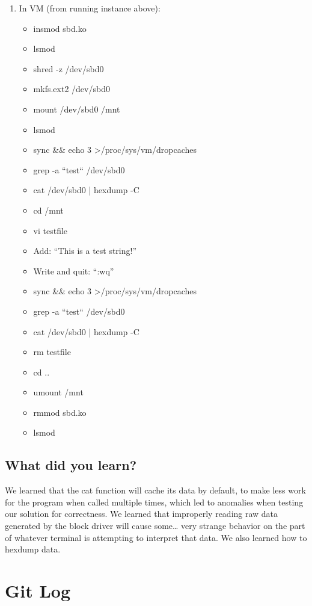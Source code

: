 \documentclass[onecolumn, draftclsnofoot,10pt, compsoc]{IEEEtran}
\begin{document}
\begin{enumerate}
    \item In VM (from running instance above):
    \begin{itemize}
        \item insmod sbd.ko
        \item lsmod
        \item shred -z /dev/sbd0
        \item mkfs.ext2 /dev/sbd0
        \item mount /dev/sbd0 /mnt
        \item lsmod
        \item sync \&\& echo 3 \textgreater /proc/sys/vm/drop\textunderscore caches
        \item grep -a ``test`` /dev/sbd0
        \item cat /dev/sbd0 | hexdump -C
        \item cd /mnt
        \item vi testfile
        \item Add: “This is a test string!”
        \item Write and quit: “:wq”
        \item sync \&\& echo 3 \textgreater /proc/sys/vm/drop\textunderscore caches
        \item grep -a ``test`` /dev/sbd0
        \item cat /dev/sbd0 | hexdump -C
        \item rm testfile
        \item cd ..
        \item umount /mnt
        \item rmmod sbd.ko
        \item lsmod
    \end{itemize}

\end{enumerate}

\subsection{What did you learn?}
We learned that the cat function will cache its data by default, to make less work for the program when called multiple times, which led to anomalies when testing our solution for correctness. We learned that improperly reading raw data generated by the block driver will cause some… very strange behavior on the part of whatever terminal is attempting to interpret that data. We also learned how to hexdump data.

\section{Git Log}
\end{document}
